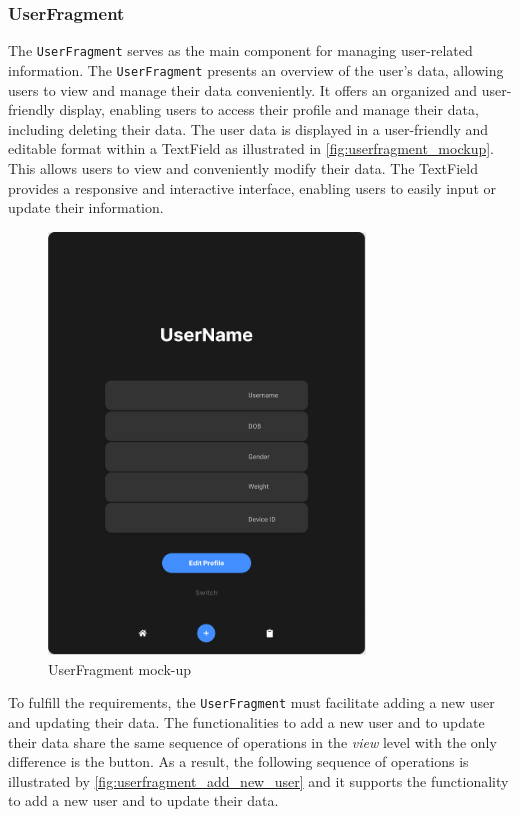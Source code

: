 \subsubsection{UserFragment}
The \texttt{UserFragment} serves as the main component for managing user-related information. 
The \texttt{UserFragment} presents an overview of the user's data, allowing users to view and manage their data conveniently. 
It offers an organized and user-friendly display, enabling users to access their profile and manage their data, including deleting their data.
The user data is displayed in a user-friendly and editable format within a TextField as illustrated in \autoref{fig:userfragment_mockup}. This allows users to view and conveniently modify their data. 
The TextField provides a responsive and interactive interface, enabling users to easily input or update their information. 

\begin{figure}[H]
    \centering
    \includegraphics[width=0.75\textwidth]{images/user-fragment-mockup.png}
    \caption{UserFragment mock-up}
    \label{fig:userfragment_mockup}
\end{figure}

To fulfill the requirements, the \texttt{UserFragment} must facilitate adding a new user and updating their data. The functionalities to add a new user and to update their data share the same sequence of operations in the \emph{view} level with the only difference is the button.
As a result, the following sequence of operations is illustrated by \autoref{fig:userfragment_add_new_user} and it supports the functionality to add a new user and to update their data.

